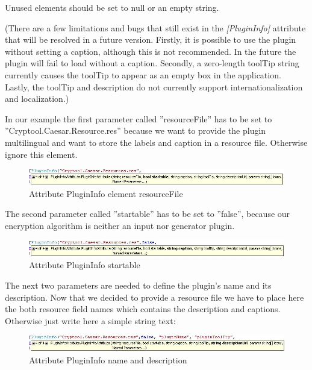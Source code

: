 Unused elements should be set to null or an empty string.

(There are a few limitations and bugs that still exist in the \textit{[PluginInfo]} attribute that will be resolved in a future version. Firstly, it is possible to use the plugin without setting a caption, although this is not recommended. In the future the plugin will fail to load without a caption. Secondly, a zero-length toolTip string currently causes the toolTip to appear as an empty box in the application. Lastly, the toolTip and description do not currently support internationalization and localization.)

In our example the first parameter called ''resourceFile'' has to be set to ''Cryptool.Caesar.Resource.res'' because we want to provide the plugin multilingual and want to store the labels and caption in a resource file. Otherwise ignore this element.
\begin{figure}[h]
	\centering
		\includegraphics[width=1.00\textwidth]{figures/attribute_plugininfo_resourceFile.JPG}
	\caption{Attribute PluginInfo element resourceFile}
	\label{fig:attribute_plugininfo_resourceFile}
\end{figure}

The second parameter called ''startable'' has to be set to ''false'', because our encryption algorithm is neither an input nor generator plugin.
\begin{figure}[h!]
	\centering
		\includegraphics[width=1.00\textwidth]{figures/attribute_plugininfo_startable.jpg}
	\caption{Attribute PluginInfo startable}
	\label{fig:attribute_plugininfo_startable}
\end{figure}

The next two parameters are needed to define the plugin's name and its description. Now that we decided to provide a resource file we have to place here the both resource field names which contains the description and captions. Otherwise just write here a simple string text:
\begin{figure}[h!]
	\centering
		\includegraphics[width=1.00\textwidth]{figures/attribute_plugininfo_description.jpg}
	\caption{Attribute PluginInfo name and description}
	\label{fig:attribute_plugininfo_description}
\end{figure}

